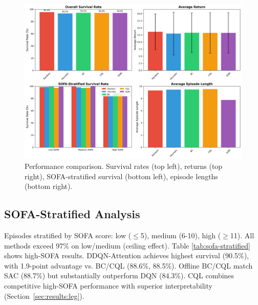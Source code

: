 \begin{figure}[htbp]
\centering
\includegraphics[width=\textwidth]{../results/figures/algorithm_comparison.png}
\caption{Performance comparison. Survival rates (top left), returns (top right), SOFA-stratified survival (bottom left), episode lengths (bottom right).}
\label{fig:algorithm-comparison}
\end{figure}


\subsection{SOFA-Stratified Analysis}\label{sec:results:sofa}

Episodes stratified by SOFA score: low ($\leq$5), medium (6-10), high ($\geq$11). All methods exceed 97\% on low/medium (ceiling effect). Table \ref{tab:sofa-stratified} shows high-SOFA results. DDQN-Attention achieves highest survival (90.5\%), with 1.9-point advantage vs. BC/CQL (88.6\%, 88.5\%). Offline BC/CQL match SAC (88.7\%) but substantially outperform DQN (84.3\%). CQL combines competitive high-SOFA performance with superior interpretability (Section~\ref{sec:results:leg}).

